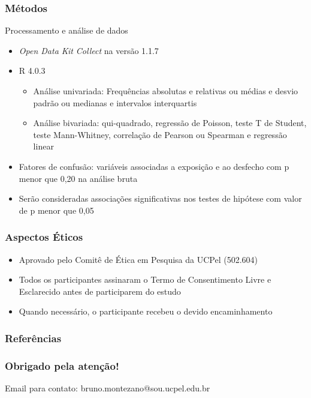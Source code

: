 \documentclass{beamer}
\begin{document}
\begin{frame}
\frametitle{Métodos}

    \begin{block}{Processamento e análise de dados}
        \begin{itemize}
            \item \emph{Open Data Kit Collect} na versão 1.1.7       
            \item R 4.0.3
            \begin{itemize}
                \item Análise univariada: Frequências absolutas e relativas ou
                médias e desvio padrão ou medianas e intervalos interquartis
                \item Análise bivariada: qui-quadrado, regressão de Poisson,
                teste T de Student, teste Mann-Whitney, correlação de Pearson
                ou Spearman e regressão linear
            \end{itemize}
            \item Fatores de confusão: variáveis associadas a exposição e ao
            desfecho com p menor que 0,20 na análise bruta
            \item Serão consideradas associações significativas nos testes de
            hipótese com valor de p menor que 0,05
        \end{itemize}
    \end{block}

\end{frame}

\begin{frame}
\frametitle{Aspectos Éticos}

    \Large
    \begin{itemize}

        \item Aprovado pelo Comitê de Ética em Pesquisa da UCPel (502.604)

        \item Todos os participantes assinaram o Termo de Consentimento Livre
        e Esclarecido antes de participarem do estudo

        \item Quando necessário, o participante recebeu o devido encaminhamento

    \end{itemize}

\end{frame}

\begin{frame}[allowframebreaks]
\frametitle{Referências}

\printbibliography

\end{frame}

\begin{frame}
\frametitle{Obrigado pela atenção!}

    \begin{block}{Email para contato:}
        bruno.montezano@sou.ucpel.edu.br
    \end{block}

\end{frame}
\end{document}
